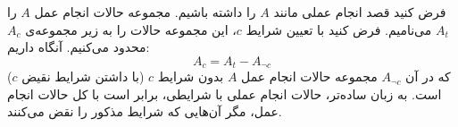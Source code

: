 
\begin{DEFINITION}
    \p
    فرض کنید قصد انجام عملی مانند
    $A$
    را داشته باشیم.
    مجموعه حالات انجام عمل
    $A$
    را
    $A_t$
    می‌نامیم. فرض کنید با تعیین شرایط 
    $c$،
    این مجموعه حالات را به زیر مجموعه‌ی
    $A_c$
    محدود می‌کنیم.
    آنگاه داریم:
    $$A_c = A_t - A_{\lnot c}$$
    که در آن
    $A_{\lnot c}$
    مجموعه حالات انجام عمل
    $A$
    بدون شرایط
    $c$
    (با داشتن شرایط نقیض $c$)
    است.
    به زبان ساده‌تر، حالات انجام عملی با شرایطی، برابر است با کل حالات انجام عمل، مگر آن‌هایی که شرایط مذکور را نقض می‌کنند.
\end{DEFINITION}




